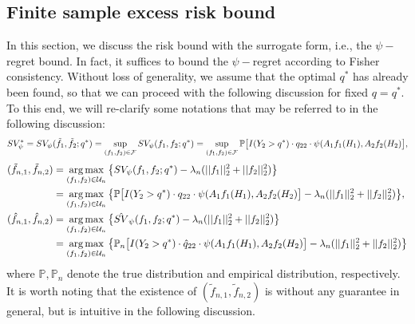 \documentclass[10pt]{article}
\DeclareMathOperator*{\argmax}{arg\,max}
\theoremstyle{remark} \newtheorem{rem}{Remark}
\begin{document}
\subsection{Finite sample excess risk bound}
In this section, we discuss the risk bound with the surrogate form, i.e., the $\psi-$regret bound.
In fact, it suffices to bound the $\psi-$regret according to Fisher consistency.
Without loss of generality, we assume that the optimal $q^*$ has already been found, so that we can proceed with the following discussion for fixed $q = q^*$. 
To this end, we will re-clarify some notations that may be referred to in the following discussion:
\begin{align}
    & SV_\psi^{*} = SV_\psi(\tilde f_1,\tilde f_2;q^*) = \sup_{(f_1,f_2) \in \mathcal{F}}SV_\psi(f_1,f_2;q^*)
    = \sup_{(f_1,f_2) \in \mathcal{F}}\mathbb{P}\big[I(Y_2>q^*)\cdot q_{22}\cdot \psi(A_1f_1(H_1), A_2f_2(H_2)\big], \notag\\
\end{align}
\begin{align}
     (\tilde f_{n,1}, \tilde f_{n,2}) & = \argmax_{(f_1,f_2) \in \mathcal{U}_n} \big\{SV_\psi(f_1,f_2;q^*) - \lambda_n(||f_1||_{2}^2+||f_2||_{2}^2)\big\} \notag\\
     &= \argmax_{(f_1,f_2) \in \mathcal{U}_n}\big\{ \mathbb{P}\big[I(Y_2>q^*)\cdot q_{22}\cdot \psi(A_1f_1(H_1), A_2f_2(H_2)\big] - \lambda_n(||f_1||_{2}^2+||f_2||_{2}^2) \big\},\notag\\
     (\hat f_{n,1}, \hat f_{n,2}) & = \argmax_{(f_1,f_2) \in \mathcal{U}_n} \big\{\hat{SV}_\psi(f_1,f_2;q^*) - \lambda_n(||f_1||_{2}^2+||f_2||_{2}^2)\big\} \notag\\
     &= \argmax_{(f_1,f_2) \in \mathcal{U}_n} \big\{\mathbb{P}_n\big[I(Y_2>q^*)\cdot \hat q_{22}\cdot \psi(A_1f_1(H_1), A_2f_2(H_2)\big] - \lambda_n(||f_1||_{2}^2+||f_2||_{2}^2)\big\} \notag
\end{align}
where $\mathbb{P}, \mathbb{P}_n$ denote the true distribution and empirical distribution, respectively.
It is worth noting that the existence of $(\tilde f_{n,1},\tilde f_{n,2})$ is without any guarantee in general, but is intuitive in the following discussion. 
\end{document}
